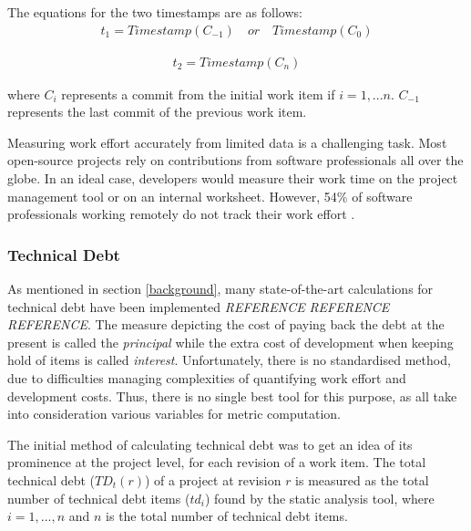 \documentclass{mpaper}
\begin{document}
The equations for the two timestamps are as follows:
\begin{equation}
  \label{eq-commit-start}
  \begin{aligned}
    t_{1} = Timestamp(C_{-1}) \quad or \quad Timestamp(C_{0})
  \end{aligned}
\end{equation}

\begin{equation}
  \label{eq-commit-end}
  \begin{aligned}
    t_{2} = Timestamp(C_{n})
  \end{aligned}
\end{equation}

where $C_{i}$ represents a commit from the initial work item if $i = 1,...n$.
$C_{-1}$ represents the last commit of the previous work item.

Measuring work effort accurately from limited data is a challenging task. Most
open-source projects rely on contributions from software professionals all over
the globe. In an ideal case, developers would measure their work time on the
project management tool or on an internal worksheet. However, 54\% of software
professionals working remotely do not track their work effort
\cite{DeveloperSurvey2018}.

\subsubsection*{Technical Debt}

As mentioned in section \ref{background}, many state-of-the-art calculations for
technical debt have been implemented \emph{REFERENCE} \emph{REFERENCE}
\emph{REFERENCE}. The measure depicting the cost of paying back the debt at the
present is called the \textit{principal} while the extra cost of development
when keeping hold of items is called \textit{interest}. Unfortunately, there is
no standardised method, due to difficulties managing complexities of quantifying
work effort and development costs. Thus, there is no single best tool for this
purpose, as all take into consideration various variables for metric computation. 

The initial method of calculating technical debt was to get an idea of its
prominence at the project level, for each revision of a work item. The total
technical debt ($TD_{t}(r)$) of a project at revision $r$ is measured as the
total number of technical debt items ($td_{i}$) found by the static analysis
tool, where $i = 1,..., n$ and $n$ is the total number of technical debt items.
\end{document}
